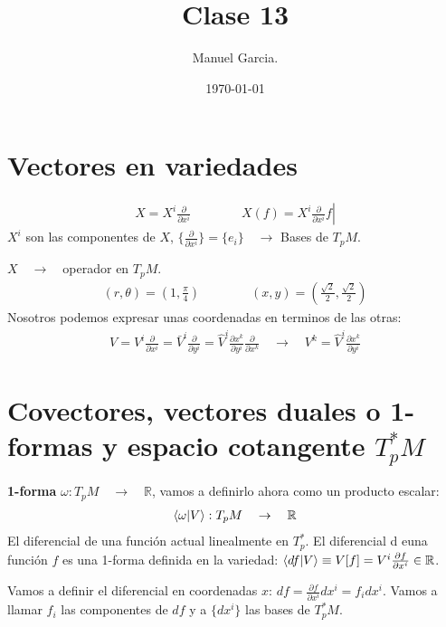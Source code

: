 \documentclass{article}
\title{Clase 13}
\author{Manuel Garcia.}
\date{\today}
\begin{document}
\maketitle

\section{Vectores en variedades}
\begin{gather*}
  X = X ^ {i } \frac{\partial  }{\partial x ^ {i }} \qquad \qquad X(f) = \left. X ^ {i } \frac{\partial  }{\partial x ^ {i }}f \right|
\end{gather*}
$ X ^ {i } $ son las componentes de $ X  $, $ \{\frac{\partial  }{\partial x ^ {i }}\}  = \{e_i \} \quad \rightarrow $ Bases de $ T_p M  $.

$ X \quad \rightarrow \quad  $operador en $ T_p M  $. 
\begin{gather*}
  (r,\theta ) = (1, \frac{\pi}{4 })\qquad \qquad (x,y) = \left(\frac{\sqrt{2 } }{2}, \frac{\sqrt{2 } }{2 }\right) 
\end{gather*}
Nosotros podemos expresar unas coordenadas en terminos de las otras: 
\begin{gather*}
  V = V ^ {i } \frac{\partial  }{\partial x ^ {i }} = \bar V ^ {i } \frac{\partial  }{\partial y ^ {i }}  
   = \hat V ^ {i } \frac{\partial x ^ {k } }{\partial y ^ {i }} \frac{\partial  }{\partial x ^ {k }} \quad \rightarrow \quad V ^ {k } = \hat V ^ {i } \frac{\partial x ^ {k } }{\partial y ^ {i }}
\end{gather*}

\section{Covectores, vectores duales o 1-formas y espacio cotangente $ T_p^*M  $}
\textbf{1-forma } $ \omega: T_pM \quad \rightarrow \quad \mathbb{R} $, vamos a definirlo ahora como un producto escalar: 
\begin{gather*}
  \bra{\omega}\ket{V }: T_p M \quad \rightarrow \quad \mathbb{R}  
\end{gather*}
El diferencial de una función actual linealmente en $ T_p^*  $. El diferencial d euna función $ f  $ es una 1-forma definida en la variedad: $ \bra{df }\ket{V } \equiv V[f] = V ^ {i } \frac{\partial f  }{\partial x ^ {i }}\in \mathbb{R} $.

Vamos a definir el diferencial en coordenadas $ x  $: $ df = \frac{\partial f  }{\partial x ^ {i }}dx ^ {i } = f_i dx ^ {i }$. Vamos a llamar $ f_i  $ las componentes de $ df  $ y a $ \{dx ^ {i }\} $ las bases de $ T_p ^ {* }M  $.
\end{document}
